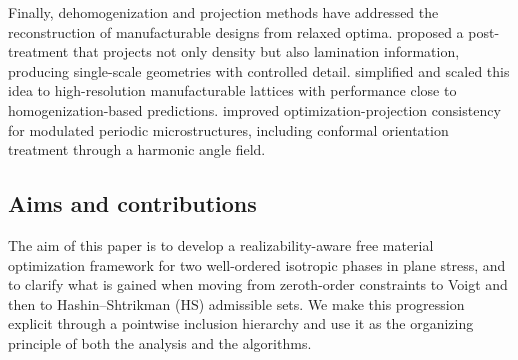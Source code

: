 \documentclass[preprint,3p]{elsarticle}
\begin{document}
Finally, dehomogenization and projection methods have addressed the reconstruction of manufacturable designs from relaxed optima. \citet{Pantz2008} proposed a post-treatment that projects not only density but also lamination information, producing single-scale geometries with controlled detail. \citet{Groen2017} simplified and scaled this idea to high-resolution manufacturable lattices with performance close to homogenization-based predictions.  \citet{Allaire2019} improved optimization-projection consistency for modulated periodic microstructures, including conformal orientation treatment through a harmonic angle field.

\subsection{Aims and contributions}\label{sec:intro_aims}
The aim of this paper is to develop a realizability-aware free material optimization framework for two well-ordered isotropic phases in plane stress, and to clarify what is gained when moving from zeroth-order constraints to Voigt and then to Hashin--Shtrikman (HS) admissible sets. We make this progression explicit through a pointwise inclusion hierarchy and use it as the organizing principle of both the analysis and the algorithms.
\end{document}

